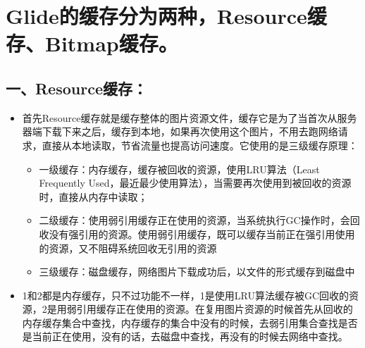 \documentclass[9pt, b5paper]{article}
\begin{document}
\section{Glide的缓存分为两种，Resource缓存、Bitmap缓存。}
\label{sec-7}
\subsection{一、Resource缓存：}
\label{sec-7-1}
\begin{itemize}
\item 首先Resource缓存就是缓存整体的图片资源文件，缓存它是为了当首次从服务器端下载下来之后，缓存到本地，如果再次使用这个图片，不用去跑网络请求，直接从本地读取，节省流量也提高访问速度。它使用的是三级缓存原理：
\begin{itemize}
\item 一级缓存：内存缓存，缓存被回收的资源，使用LRU算法（Least Frequently Used，最近最少使用算法），当需要再次使用到被回收的资源时，直接从内存中读取；
\item 二级缓存：使用弱引用缓存正在使用的资源，当系统执行GC操作时，会回收没有强引用的资源。使用弱引用缓存，既可以缓存当前正在强引用使用的资源，又不阻碍系统回收无引用的资源
\item 三级缓存：磁盘缓存，网络图片下载成功后，以文件的形式缓存到磁盘中
\end{itemize}
\item 1和2都是内存缓存，只不过功能不一样，1是使用LRU算法缓存被GC回收的资源，2是用弱引用缓存正在使用的资源。在复用图片资源的时候首先从回收的内存缓存集合中查找，内存缓存的集合中没有的时候，去弱引用集合查找是否是当前正在使用，没有的话，去磁盘中查找，再没有的时候去网络中查找。
\end{itemize}
\end{document}
